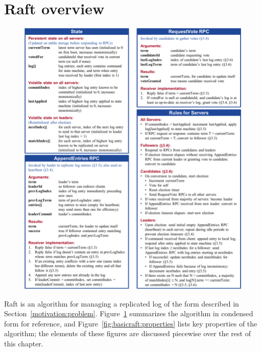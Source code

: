 \section{Raft overview}
\label{basicraft:overview}

\begin{figure}
\centering
\includegraphics[scale=0.95]{basicraft/cheatsheet}
\label{fig:basicraft:cheatsheet}
\end{figure}




Raft is an algorithm for managing
a replicated log of the form described in Section~\ref{motivation:problem}.
Figure~\ref{fig:basicraft:cheatsheet}
summarizes the algorithm in condensed form for reference,
and Figure~\ref{fig:basicraft:properties} lists key properties of the
algorithm; the elements of these figures
are discussed piecewise over the rest of this chapter.

